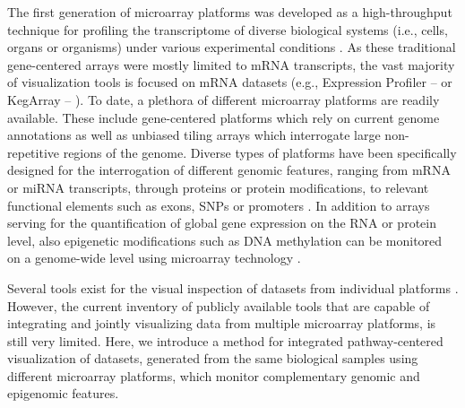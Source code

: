 \documentclass{bioinfo}
\begin{document}
The first generation of microarray platforms was developed as a high-throughput technique for
profiling the transcriptome of diverse biological systems (i.e., cells, organs or organisms) under
various experimental conditions \citep{Schena1995, Golub1999}. As these traditional gene-centered
arrays were mostly limited to mRNA transcripts, the vast majority of visualization tools is focused
on mRNA datasets (e.g., Expression Profiler -- \citealp{Kapushesky2004} or KegArray --
\citealp{KEGG}). To date, a plethora of different microarray platforms are readily available. These
include gene-centered platforms which rely on current genome annotations as well as unbiased tiling
arrays which interrogate large non-repetitive regions of the genome. Diverse types of platforms have
been specifically designed for the interrogation of different genomic features, ranging from mRNA or
miRNA transcripts, through proteins or protein modifications, to relevant functional elements such
as exons, SNPs or promoters \citep{Hoheisel2006}. In addition to arrays serving for the
quantification of global gene expression on the RNA or protein level, also epigenetic modifications
such as DNA methylation can be monitored on a genome-wide level using microarray technology
\citep{Schumacher2006}.

Several tools exist for the visual inspection of datasets from individual platforms \citep[see][for
some examples]{Gehlenborg2010}. However, the current inventory of publicly available tools that are
capable of integrating and jointly visualizing data from multiple microarray platforms, is still
very limited.  Here, we introduce a method for integrated pathway-centered visualization of
datasets, generated from the same biological samples using different microarray platforms, which
monitor complementary genomic and epigenomic features.
\end{document}
